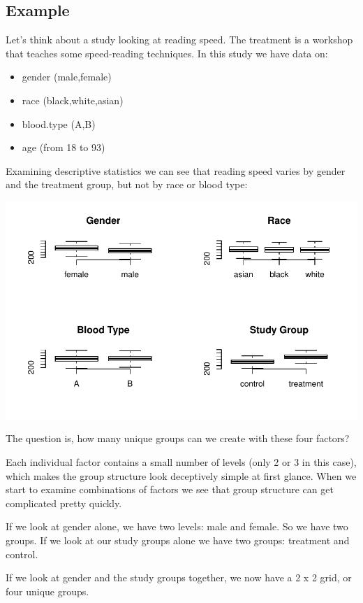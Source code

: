 \documentclass[]{book}
\providecommand{\tightlist}{%
  \setlength{\itemsep}{0pt}\setlength{\parskip}{0pt}}
\theoremstyle{definition}
\theoremstyle{definition}
\theoremstyle{definition}
\theoremstyle{remark}
\begin{document}
\hypertarget{example}{%
\subsection{Example}\label{example}}

Let's think about a study looking at reading speed. The treatment is a
workshop that teaches some speed-reading techniques. In this study we
have data on:

\begin{itemize}
\tightlist
\item
  gender (male,female)
\item
  race (black,white,asian)
\item
  blood.type (A,B)
\item
  age (from 18 to 93)
\end{itemize}

Examining descriptive statistics we can see that reading speed varies by
gender and the treatment group, but not by race or blood type:

\begin{center}\includegraphics[width=0.7\linewidth]{DS4PS-I_files/figure-latex/unnamed-chunk-160-1} \end{center}

The question is, how many unique groups can we create with these four
factors?

Each individual factor contains a small number of levels (only 2 or 3 in
this case), which makes the group structure look deceptively simple at
first glance. When we start to examine combinations of factors we see
that group structure can get complicated pretty quickly.

If we look at gender alone, we have two levels: male and female. So we
have two groups. If we look at our study groups alone we have two
groups: treatment and control.

If we look at gender and the study groups together, we now have a 2 x 2
grid, or four unique groups.
\end{document}
